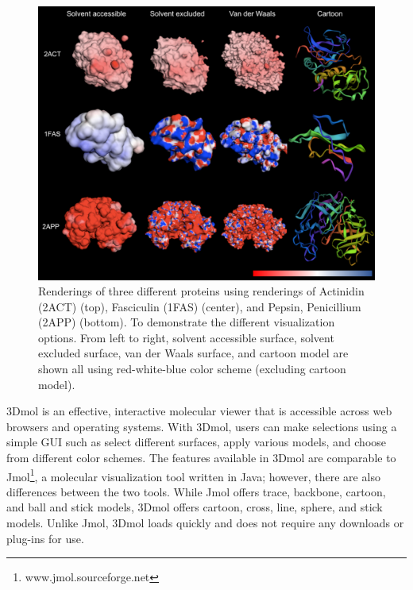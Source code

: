 \documentclass[11pt,titlepage]{article}
\begin{document}
\begin{figure}
	\begin{center}
		\includegraphics[width=.75\paperwidth]{features.png}
		\caption{\small Renderings of three different proteins using renderings of Actinidin (2ACT) (top), Fasciculin (1FAS) (center), and Pepsin, Penicillium (2APP) (bottom). To demonstrate the different  visualization options. From left to right, solvent accessible surface, solvent excluded surface, van der Waals  surface, and cartoon model are shown all using red-white-blue color scheme (excluding cartoon model). 
			\label{fig:features}}  
	\end{center}  
\end{figure}

3Dmol is an effective, interactive molecular viewer that is accessible across web browsers and operating systems. With 3Dmol, users can make selections using a simple GUI such as select different surfaces, apply various models, and choose from different color schemes.  The features available in 3Dmol are comparable to Jmol\footnote{www.jmol.sourceforge.net}, a molecular visualization tool written in Java; however, there are also differences between the two tools. While Jmol offers trace, backbone, cartoon, and ball and stick models, 3Dmol offers cartoon, cross, line, sphere, and stick models. Unlike Jmol, 3Dmol loads quickly and does not require any downloads or plug-ins for use. 
\end{document}
